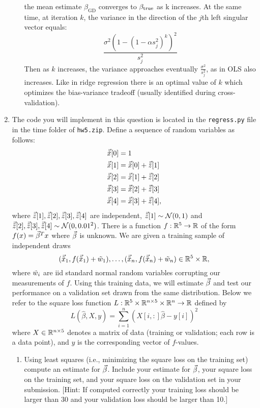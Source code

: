 \documentclass[12pt,twoside]{article}
\begin{document}
\begin{enumerate}
\begin{enumerate}
the mean estimate $\beta_{\text{GD}}$ converges to $\beta_{\operatorname{true}}$ as k increases.
At the same time, at iteration $k$, the variance in the direction of the $j$th left singular vector equals:
	$$\frac{\sigma^2 (1 - (1 - \alpha s_j^2)^k)^2}  {s_j^2}$$
Then as $k$ increases, the variance approaches eventually $\frac{\sigma^2}{s_j^2}$, as in OLS also increases.
Like in ridge regression there is an optimal value of $k$ which optimizes the bias-variance tradeoff (usually identified during cross-validation).
 
 \end{enumerate}
 
\item The code you will implement in this question is located in the
  \verb|regress.py| file in the time folder of  \verb|hw5.zip|.
  Define a sequence of random variables as follows:
  \begin{align*}
    \vec{\tilde{ x }} [0] &= 1\\
    \vec{\tilde{ x }}[1] &= \vec{\tilde{ x }}[0]+\vec{\tilde{ z }}[1]\\
    \vec{\tilde{ x }}[2] &= \vec{\tilde{ x }}[1]+\vec{\tilde{ z }}[2]\\
    \vec{\tilde{ x }}[3] &= \vec{\tilde{ x }}[2]+\vec{\tilde{ z }}[3]\\
    \vec{\tilde{ x }}[4] &= \vec{\tilde{ x }}[3]+\vec{\tilde{ z }}[4],
  \end{align*}
  where $\vec{\tilde{ z }}[1],\vec{\tilde{ z }}[2],\vec{\tilde{ z }}[3],\vec{\tilde{ z }}[4]$ are independent,
  $\vec{\tilde{ z }}[1]\sim\operatorname{\mathcal{N}}(0,1)$ and
  $\vec{\tilde{ z }}[2],\vec{\tilde{ z }}[3],\vec{\tilde{ z }}[4]\sim\operatorname{\mathcal{N}}(0,0.01^2)$.  There is a function
  $f:\mathbb{R}^5\to\mathbb{R}$ of the form $f(x)=\vec{\beta}^Tx$ where $\vec{\beta}$ is
  unknown.  We are given a training sample of independent draws
  $$(\vec{\tilde{ x }}_1,f(\vec{\tilde{ x }}_1)+\tilde{ w }_1),\ldots,(\vec{\tilde{ x }}_n,f(\vec{\tilde{ x }}_n)+\tilde{ w }_n)\in\mathbb{R}^5\times\mathbb{R},$$
  where $\tilde{ w }_i$ are iid standard normal random variables corrupting
  our measurements of $f$.
  Using this training data, we will estimate $\vec{\beta}$ and test our
  performance on a validation set drawn from the same distribution.
  Below we refer to the square loss function
  $L:\mathbb{R}^5\times\mathbb{R}^{n\times 5}\times\mathbb{R}^n\to\mathbb{R}$ defined by
  $$L(\hat{\beta},X,y) = \sum_{i=1}^n (X[i,:]\hat{\beta}-y[i])^2$$
  where $X\in\mathbb{R}^{n\times 5}$ denotes a matrix of data (training or validation; each row
  is a data point), and $y$ is the corresponding vector of $f$-values.
  \begin{enumerate}
  \item Using least squares (i.e., minimizing the square loss on the
    training set) compute an estimate for $\vec{\beta}$.  Include your
    estimate for $\vec{\beta}$, your square loss on the training set, and
    your square loss on the validation set in your submission.
    [Hint: If computed correctly your training loss should be larger
      than 30 and your validation loss should be larger than 10.]
      

\end{enumerate}
\end{enumerate}
\end{document}
